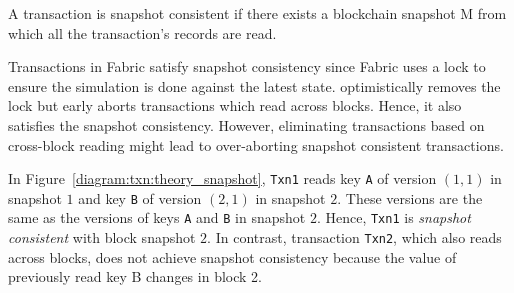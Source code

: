 {\begin{definition}
  \label{defn:inconsistentExe}
  A transaction is snapshot consistent if there exists a blockchain snapshot M
  from which all the transaction's records are read.
\end{definition}

Transactions in Fabric satisfy snapshot consistency since Fabric uses a lock to
ensure the simulation is done against the latest state.
%
{\fabricPlusplus} optimistically removes the lock but early aborts transactions which read across blocks.
%
Hence, it also satisfies the snapshot consistency. 
%
However, eliminating transactions based on cross-block reading might
lead to over-aborting snapshot consistent transactions.

\begin{example}
  \label{example:txn:acrossBlk}
  In Figure~\ref{diagram:txn:theory_snapshot}, \texttt{Txn1} reads key
  \texttt{A} of version $(1,1)$ in snapshot $1$ and key \texttt{B} of
  version $(2,1)$ in snapshot $2$.
  These versions are the same as the versions of keys \texttt{A} and \texttt{B} in snapshot $2$.
  Hence, \texttt{Txn1} is \textit{snapshot consistent} with block snapshot $2$.
  In contrast, transaction \texttt{Txn2}, which also reads across blocks, does
  not achieve snapshot consistency because the value of previously read key B
  changes in block 2.
\end{example}


}
